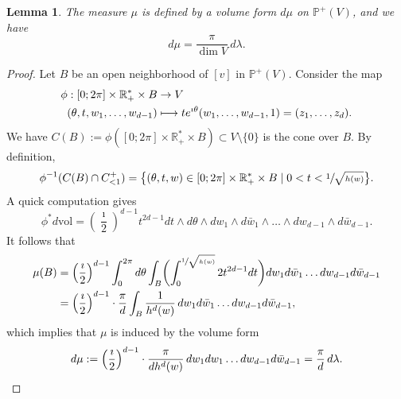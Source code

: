 \documentclass[10pt]{amsart}
\newcommand\mto{\mathchoice{\longmapsto}{\mapsto}{\mapsto}{\mapsto}}
\theoremstyle{plain}
\newtheorem{Lemma}[Theorem]{Lemma}
\theoremstyle{definition}
\newcommand{\R}{\mathbb{R}}
\newcommand{\Pb}{\mathbb{P}}
\newcommand{\vol}{\mathrm{vol}}
\begin{document}
\begin{Lemma}\label{lm:pushed:vol:form}
The measure $\mu$ is defined by a volume form $d\mu$ on $\Pb^+(V)$, and we have
\[
d\mu=\frac{\pi}{\dim V}\,d\lambda.
\]
\end{Lemma}
\begin{proof}
Let $B$ be an open neighborhood of $[v]$ in $\Pb^+(V)$. Consider the map
\begin{align*}
\phi: [0;2\pi]\times\R_+^*\times B & \to V\\
 (\theta,t,w_1,\dots,w_{d-1}) & \mto te^{\imath\theta}(w_1,\dots,w_{d-1},1)=(z_1,\dots,z_d).
\end{align*}
We have $C(B):=\phi([0;2\pi]\times\R^*_+\times B)\subset V\setminus\{0\}$ is the cone over $B$. By definition,
\[
\phi^{-1}(C(B)\cap C^+_{<1})=\bigl\{(\theta,t,w) \in [0;2\pi]\times\R_+^*\times B\mid 0< t < \sfrac{1}{\sqrt{h(w)}}\bigr\}.
\]
A quick computation gives
\[
\phi^*d\vol=\left(\frac{\imath}{2}\right)^{d-1} t^{2d-1}dt\wedge d\theta\wedge dw_1\wedge d\bar{w}_1\wedge\dots\wedge dw_{d-1}\wedge d\bar{w}_{d-1}.
\]
It follows that
\begin{align*}
\mu(B)&= \left(\frac{\imath}{2}\right)^{d-1} \int_0^{2\pi}d\theta \int_B \biggl(\int_0^{\sfrac{1}{\sqrt{h(w)}}} 2t^{2d-1}dt\biggr) dw_1d\bar{w}_1\dots dw_{d-1}d\bar{w}_{d-1}\\
&= \left(\frac{\imath}{2}\right)^{d-1}\cdot\frac{\pi}{d}\int_B \frac{1}{h^{d}(w)}\,dw_1d\bar{w}_1\dots dw_{d-1}d\bar{w}_{d-1},
\end{align*}
which implies that $\mu$ is induced by the volume form
\[
d\mu:=\left(\frac{\imath}{2}\right)^{d-1}\cdot\frac{\pi}{dh^d(w)}\,dw_1dw_1\dots dw_{d-1}d\bar{w}_{d-1}=\frac{\pi}{d}\,d\lambda.\qedhere
\]
\end{proof}
\end{document}
